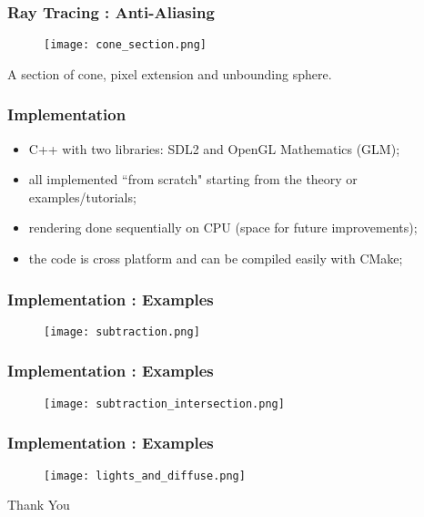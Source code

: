 \documentclass{beamer}
\begin{document}
\begin{frame}
\frametitle{Ray Tracing : Anti-Aliasing}
\begin{figure}[!htb]
  \centering
  \texttt{[image: cone\_section.png]}
\end{figure}
A section of cone, pixel extension and unbounding sphere.
\end{frame}




\begin{frame}
\frametitle{Implementation}
\begin{itemize}
  \item C++ with two libraries: SDL2 and OpenGL Mathematics (GLM);
  \item all implemented ``from scratch" starting from the theory or examples/tutorials;
  \item rendering done sequentially on CPU (space for future improvements);
  \item the code is cross platform and can be compiled easily with CMake;
\end{itemize}
\end{frame}


\begin{frame}
\frametitle{Implementation : Examples}
\begin{figure}[!htb]
  \centering
  \texttt{[image: subtraction.png]}
\end{figure}
\end{frame}



\begin{frame}
\frametitle{Implementation : Examples}
\begin{figure}[!htb]
  \centering
  \texttt{[image: subtraction\_intersection.png]}
\end{figure}
\end{frame}



\begin{frame}
\frametitle{Implementation : Examples}
\begin{figure}[!htb]
  \centering
  \texttt{[image: lights\_and\_diffuse.png]}
\end{figure}
\end{frame}


\begin{frame}
  Thank You
\end{frame}


\end{document}
